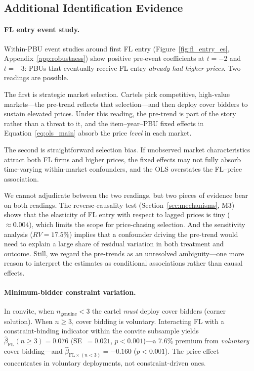 
\subsection{Additional Identification Evidence}
\label{sec:additional_id}

\paragraph{FL entry event study.}
Within-PBU event studies around first FL entry
(Figure~\ref{fig:fl_entry_es}, Appendix~\ref{app:robustness}) show
positive pre-event coefficients at $t = -2$ and $t = -3$: PBUs that
eventually receive FL entry \emph{already had higher prices}. Two
readings are possible.

The first is strategic market selection. Cartels pick competitive,
high-value markets---the pre-trend reflects that selection---and then
deploy cover bidders to sustain elevated prices. Under this reading,
the pre-trend is part of the story rather than a threat to it, and
the item--year--PBU fixed effects in Equation~\eqref{eq:ols_main}
absorb the price \emph{level} in each market.

The second is straightforward selection bias. If unobserved market
characteristics attract both FL firms and higher prices, the
fixed effects may not fully absorb time-varying within-market
confounders, and the OLS overstates the FL--price association.

We cannot adjudicate between the two readings, but two pieces of
evidence bear on both readings. The reverse-causality test
(Section~\ref{sec:mechanisms}, M3) shows that the elasticity of FL
entry with respect to lagged prices is tiny ($\approx 0.004$), which
limits the scope for price-chasing selection. And the sensitivity
analysis ($RV = 17.5\%$) implies that a confounder driving the
pre-trend would need to explain a large share of residual variation in
both treatment and outcome. Still, we regard the pre-trends as an
unresolved ambiguity---one more reason to interpret the estimates as
conditional associations rather than causal effects.

\paragraph{Minimum-bidder constraint variation.}
In convite, when $n_{\text{genuine}} < 3$ the cartel \emph{must}
deploy cover bidders (corner solution). When $n \geq 3$, cover bidding
is voluntary. Interacting FL with a constraint-binding indicator within
the convite subsample yields $\hat{\beta}_{\text{FL}}(n \geq 3) =
0.076$ (SE~$= 0.021$, $p < 0.001$)---a 7.6\% premium from
\emph{voluntary} cover bidding---and $\hat{\beta}_{\text{FL} \times
(n<3)} = -0.160$ ($p < 0.001$). The price effect concentrates in
voluntary deployments, not constraint-driven ones.

